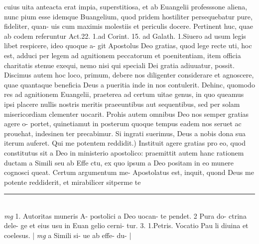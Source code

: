 \documentclass{article}
\begin{document}
\begin{pages}
cuius uita anteacta erat impia, superstitiosa, et ab Euangelii professsone aliena, nunc pium esse idemque  Buangelium, quod pridem hostiliter persequebatur pure, fideliter, quan- uis cum maximis molestiis et periculis docere. Pertinent huc, quae ab codem referuntur Act.22. 1.ad Corint. 15. ad Galath. 1.Siuero ad usum legis libet respicere, ideo quoque  a- git Apostolus Deo gratias, quod lege recte uti, hoc est, adduci per legem ad agnitionem peccatorum et poenitentiam, item officia charitatis stenue exequi, nemo nisi qui speciali Dei gratia adiuuatur, possit. Discimus autem hoc loco, primum, debere nos diligenter considerare et agnoscere, quae quantaque  beneficia Deus a pueritia inde in nos contulerit. Dehinc, quomodo res ad agnitionem Euangelii, praeterea ad certum uitae genus, in quo queamus ipsi placere nullis nostris meritis praeeuntibus aut sequentibus, sed per solam misericordiam clementer uocarit. Prohis autem omnibus Deo nos semper gratias agere o- portet, quinetiamut in posterum quoque  tempus eadem nos seruet ac prouehat, indesinen ter precabimur. Si ingrati suerimus, Deus a nobis dona sua iterum auferet.  \pend\pstart Qui me potentem reddidit.) Instituit agere gratias pro eo, quod constitutus sit a Deo in ministerio apostolico: praemittit autem hanc rationem ductam a Simili seu ab Effe ctu, ex quo ipsum a Deo positam in eo munere cognosci queat. Certum argumentum me- Apostolatus est, inquit, quond Deus me potente reddiderit, et mirabilicer sitperme te  \pend
\vspace{0.5cm}\noindent
\vspace{0.2cm}\rule{1cm}{0.2pt}\\ 
\hspace{0.2cm}\textit{mg}
\footnotesize 1. Autoritas muneris A- postolici a Deo uocan- te pendet. 2 Pura do- ctrina dele- ge et eius usu in Euan gelio cerni- tur. 3. 1.Petris. Vocatio Pau li diuina et coelesus. 
\normalsize| 
\hspace{0.2cm}\textit{mg}
\footnotesize a Simili si- ue ab effe- du- 
\normalsize| 

\end{pages}
\end{document}

